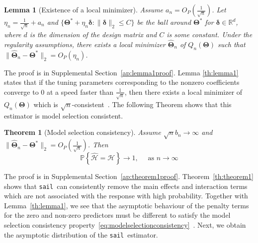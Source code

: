 \documentclass[12pt,letter]{article}\usepackage[]{graphicx}\usepackage[]{color}
\newtheorem{theorem}{Theorem}
\newtheorem{lemma}{Lemma}
\newcommand{\sail}{\texttt{sail}}
\newcommand{\bD}{\textbf{\text{D}}}
\newcommand{\bTheta}{\boldsymbol{\Theta}}
\newcommand{\btau}{\boldsymbol{\tau}}
\newcommand{\btheta}{\boldsymbol{\theta}}
\newcommand{\bPsi}{\boldsymbol{\Psi}}
\DeclareMathOperator*{\argmin}{arg\,min}
\begin{document}




\begin{lemma}[Existence of a local minimizer]\label{th:lemma1}
	Assume $a_n = O_P(\frac{1}{\sqrt{n}})$. Let $\eta_{n}=\frac{1}{\sqrt{n}}+a_{n}$ and $\{\bTheta^{*}+\eta_{n}\boldsymbol{\delta}:\|\boldsymbol{\delta}\|_2\leq C\}$
	be the ball around $\bTheta^{*}$ for $\boldsymbol{\delta} \in \mathbb{R}^d$, where $d$ is the dimension of the design matrix and $C$ is some constant. Under the regularity assumptions, there exists a local minimizer $\widehat{\bTheta}_n$ of $Q_n(\bTheta)$ such that $\|\widehat{\bTheta}_n - \bTheta^*  \|_2 = O_P(\eta_{n})$.
\end{lemma}

The proof is in Supplemental Section~\ref{ap:lemma1proof}. Lemma \eqref{th:lemma1} states that if the tuning parameters corresponding to the nonzero coefficients converge to 0 at a speed faster than $\frac{1}{\sqrt{n}}$, then there exists a local minimizer of $Q_n(\bTheta)$ which is $\sqrt{n}$-consistent~\citep{wang2007regression, choi2010variable}. The following Theorem shows that this estimator is model selection consistent.



\begin{theorem}[Model selection consistency] \label{th:theorem1}
	Assume $\sqrt{n}b_n \to \infty$ and $\|\widehat{\bTheta}_n - \bTheta^*  \|_2 = O_P(\frac{1}{\sqrt{n}})$. Then \begin{equation}
	\mathbb{P}\left\{\widehat{\mathcal{H}}=\mathcal{H}\right\} \rightarrow 1, \quad \text { as } n \rightarrow \infty \label{eq:modelselectionconsistency}
	\end{equation}
\end{theorem}

The proof is in Supplemental Section~\ref{ap:theorem1proof}. Theorem~\eqref{th:theorem1} shows that \sail ~can consistently remove the main effects and interaction terms which are not associated with the response with high probability. Together with Lemma~\eqref{th:lemma1}, we see that the asymptotic behaviour of the penalty terms for the zero and non-zero predictors must be different to satisfy the model selection consistency property~\eqref{eq:modelselectionconsistency}~\citep{nardi2008asymptotic}. Next, we obtain the asymptotic distribution of the \sail ~estimator.
\end{document}
